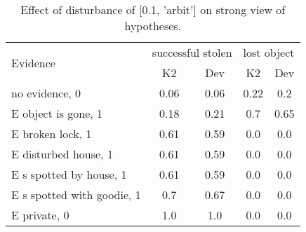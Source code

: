 \begin{table}\begin{tabular}{l|cc|cc}\toprule\multirow{2}{*}{Evidence} & \multicolumn{2}{c}{successful stolen}& \multicolumn{2}{c}{lost object}\\& {K2} & {Dev}& {K2} & {Dev}\\\midrule
no evidence, 0 & 0.06&0.06&0.22&0.2\\E object is gone, 1 & 0.18&0.21&0.7&0.65\\E broken lock, 1 & 0.61&0.59&0.0&0.0\\E disturbed house, 1 & 0.61&0.59&0.0&0.0\\E s spotted by house, 1 & 0.61&0.59&0.0&0.0\\E s spotted with goodie, 1 & 0.7&0.67&0.0&0.0\\E private, 0 & 1.0&1.0&0.0&0.0\\\bottomrule\end{tabular}\caption{Effect of disturbance of [0.1, 'arbit'] on strong view of hypotheses.}\end{table}